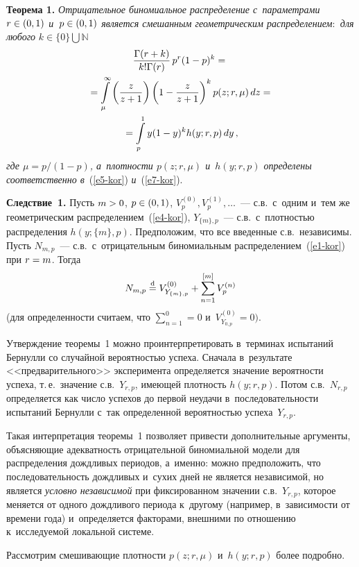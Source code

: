 \begin{multicols}{2}
\smallskip

\noindent
\textbf{Теорема 1.} \textit{Отрицательное биномиальное распределение 
с~параметрами $r\hm\in(0,1)$ и~$p\hm\in(0,1)$ является смешанным
геометрическим распределением$:$ для любого}
$k\in\{0\}\bigcup\mathbb{N}$
\begin{multline*}
\displaystyle\frac{\displaystyle \Gamma(r+k)\mathstrut}{\displaystyle k!\Gamma(r)\mathstrut}\,
p^r(1-p)^k={}\\
{}=\int\limits_{\mu}^{\infty}\left(\displaystyle\frac{\displaystyle z\mathstrut}{\displaystyle z+1\mathstrut}\right)
\left(1-\displaystyle\frac{\displaystyle z\mathstrut}{\displaystyle z+1\mathstrut}\right)^kp(z;r,\mu)\,dz={}\\
{}=\int\limits_{p}^{1}y(1-y)^kh(y;r,p)\,dy\,,
\end{multline*}
\textit{где $\mu=p/(1-p)$, а~плотности $p(z;r,\mu)$ и~$h(y;r,p)$
определены соответственно в}~(\ref{e5-kor}) \textit{и}~(\ref{e7-kor}).

\smallskip

\noindent
\textbf{Следствие~1.} Пусть $m\hm>0$, $p\hm\in(0,1)$,
$V_p^{(0)},V_p^{(1)},\ldots$~--- с.в.\ с~одним и~тем же геометрическим
распределением~(\ref{e4-kor}), $Y_{\{m\},p}$~--- с.в.\ с~плот\-ностью
распределения $h(y;\{m\},p)$. Предположим, что все введенные с.в.\
независимы. Пусть $N_{m,p}$~--- с.в.\ с~отрицательным биномиальным
распределением~(\ref{e1-kor}) при $r\hm=m$. Тогда
$$
N_{m,p}\stackrel{\mathrm{d}}{=} V^{(0)}_{Y_{\{m\},p}}+\sum\limits_{n=1}^{[m]}V_p^{(n)}
$$
(для определенности считаем, что $\sum_{n=1}^{0}=0$ и~$V^{(0)}_{Y_{0,p}}=0)$.

\smallskip

Утверждение теоремы~1 можно проинтерпретировать в~терминах испытаний
Бернулли со случайной вероятностью успеха. Сначала в~результате
<<предварительного>> эксперимента определяется значение вероятности
успеха, т.\,е.\ значение с.в.~$Y_{r,p}$, имеющей плотность
$h(y;r,p)$. Потом с.в.~$N_{r,p}$ определяется как
число успехов до первой неудачи в~последовательности испытаний
Бернулли с~так определенной вероятностью успеха~$Y_{r,p}$.

Такая интерпретация теоремы~1 позволяет привести дополнительные
аргументы, объясняющие адекватность отрицательной биномиальной
модели для распределения дождливых периодов, а~именно: можно
предположить, что последовательность дождливых и~сухих дней не
является независимой, но является {\it условно независимой} при
фиксированном значении с.в.~$Y_{r,p}$, которое меняется от одного
дождливого периода к~другому (например, в~зависимости от времени
года) и~определяется факторами, внешними по отношению к~исследуемой
локальной системе.

Рассмотрим смешивающие плотности $p(z;r,\mu)$ и~$h(y;r,p)$ более
подробно.


\end{multicols}
